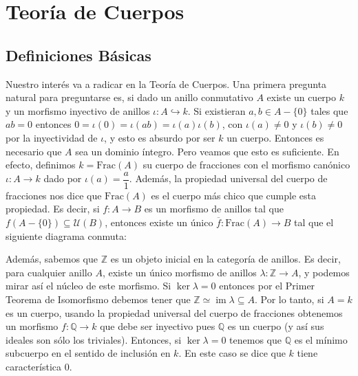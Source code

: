 \documentclass[12pt]{book}
\theoremstyle{definition}
\newcommand{\ZZ}{\mathbb{Z}}      %
\DeclareMathOperator{\im}{im}
\begin{document}
\clearpage\tableofcontents\newpage{}

\chapter{Teoría de Cuerpos}

\section{Definiciones Básicas}

Nuestro interés va a radicar en la Teoría de Cuerpos. Una primera pregunta natural para preguntarse es, si dado un anillo conmutativo $A$ existe un cuerpo $k$ y un morfismo inyectivo de anillos $\iota:A\hookrightarrow k$. Si existieran $a,b\in A-\{0\}$ tales que $ab=0$ entonces $0=\iota(0)=\iota(ab)=\iota(a)\iota(b)$, con $\iota(a)\neq 0$ y $\iota(b)\neq 0$ por la inyectividad de $\iota$, y esto es absurdo por ser $k$ un cuerpo. Entonces es necesario que $A$ sea un dominio íntegro. Pero veamos que esto es suficiente. En efecto, definimos $k=\mathrm{Frac}(A)$ su cuerpo de fracciones con el morfismo canónico $\iota:A\to k$ dado por $\iota(a) = \dfrac{a}{1}$. Además, la propiedad universal del cuerpo de fracciones nos dice que $\mathrm{Frac}(A)$ es el cuerpo más chico que cumple esta propiedad. Es decir, si $f:A\to B$ es un morfismo de anillos tal que $f(A-\{0\})\subseteq \mathcal{U}(B)$, entonces existe un único $\overline{f}:\mathrm{Frac}(A)\to B$ tal que el siguiente diagrama conmuta:
\begin{center}
\end{center}

Además, sabemos que $\ZZ$ es un objeto inicial en la categoría de anillos. Es decir, para cualquier anillo $A$, existe un único morfismo de anillos $\lambda:\mathbb{Z}\to A$, y podemos mirar así el núcleo de este morfismo. Si $\ker \lambda = 0$ entonces por el Primer Teorema de Isomorfismo debemos tener que $\ZZ \simeq \im \lambda\subseteq A$. Por lo tanto, si $A=k$ es un cuerpo, usando la propiedad universal del cuerpo de fracciones obtenemos un morfismo $f:\mathbb{Q}\to k$ que debe ser inyectivo pues $\mathbb{Q}$ es un cuerpo (y así sus ideales son sólo los triviales). Entonces, si $\ker\lambda = 0$ tenemos que $\mathbb{Q}$ es el mínimo subcuerpo en el sentido de inclusión en $k$. En este caso se dice que $k$ tiene característica $0$.
\end{document}
